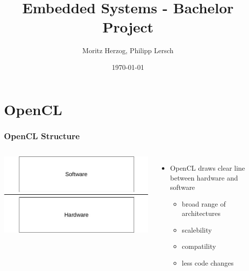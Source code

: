 \documentclass{beamer}
\title{Embedded Systems - Bachelor Project}
\author{Moritz Herzog, Philipp Lersch}
\date{\today}
\begin{document}
\maketitle


\section{OpenCL}
\begin{frame}
    \frametitle{OpenCL Structure}
    \begin{columns}
        \includegraphics[width=\textwidth]{res/HardwareSoftwareLayer.jpg}
        \begin{itemize}
            \item OpenCL draws clear line between hardware and software
            \begin{itemize}
		\item broad range of architectures
		\item scalebility
		\item compatility
		\item less code changes
	 \end{itemize}
        \end{itemize}
    \end{columns}
\end{frame}
\end{document}
